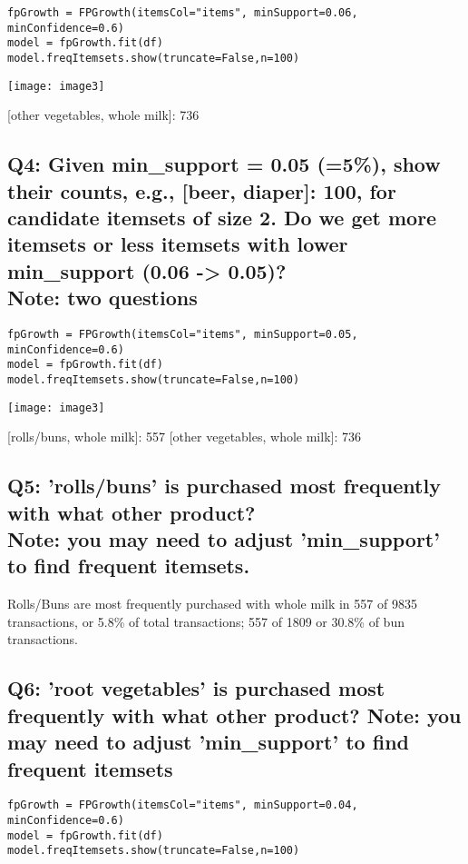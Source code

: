 \documentclass[]{article}
\begin{document}
\begin{verbatim}
fpGrowth = FPGrowth(itemsCol="items", minSupport=0.06, minConfidence=0.6)
model = fpGrowth.fit(df)
model.freqItemsets.show(truncate=False,n=100)
\end{verbatim}
\texttt{[image: image3]}

[other vegetables, whole milk]: 736 

\subsection*{Q4: Given min\_support = 0.05 (=5\%), show their counts, e.g., [beer, diaper]: 100, for candidate itemsets of size 2. Do we get more itemsets or less itemsets with lower min\_support (0.06 -> 0.05)? \\ Note: two questions}

\begin{verbatim}
fpGrowth = FPGrowth(itemsCol="items", minSupport=0.05, minConfidence=0.6)
model = fpGrowth.fit(df)
model.freqItemsets.show(truncate=False,n=100)
\end{verbatim}
\texttt{[image: image3]}

[rolls/buns, whole milk]: 557
[other vegetables, whole milk]: 736 

\subsection*{Q5: 'rolls/buns' is purchased most frequently with what other product? \\	Note: you may need to adjust 'min\_support' to find frequent itemsets.}

Rolls/Buns are most frequently purchased with whole milk in 557 of 9835 transactions, or 5.8\% of total transactions; 557 of 1809 or 30.8\% of bun transactions.

\subsection*{Q6: 'root vegetables' is purchased most frequently with what other product? Note: you may need to adjust 'min\_support' to find frequent itemsets}

\begin{verbatim}
fpGrowth = FPGrowth(itemsCol="items", minSupport=0.04, minConfidence=0.6)
model = fpGrowth.fit(df)
model.freqItemsets.show(truncate=False,n=100)
\end{verbatim}
\end{document}
